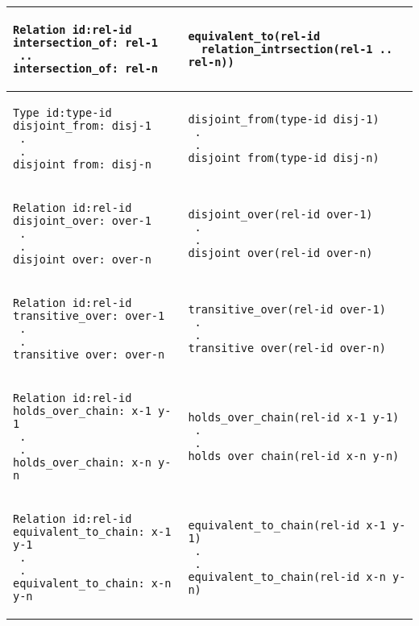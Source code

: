 \begin{scriptsize}
\begin{longtable}{ | p{7cm} | p{7cm} |}
\hline
\begin{verbatim}
Relation id:rel-id
intersection_of: rel-1
 ..
intersection_of: rel-n
\end{verbatim}
&
\begin{verbatim}
equivalent_to(rel-id 
  relation_intrsection(rel-1 .. rel-n))
\end{verbatim}
\\

\hline
\begin{verbatim}
Type id:type-id
disjoint_from: disj-1
 .
 .
disjoint_from: disj-n
\end{verbatim}
&
\begin{verbatim}
disjoint_from(type-id disj-1)
 .
 .
disjoint_from(type-id disj-n)
\end{verbatim}
\\

\hline
\begin{verbatim}
Relation id:rel-id
disjoint_over: over-1
 .
 .
disjoint_over: over-n
\end{verbatim}
&
\begin{verbatim}
disjoint_over(rel-id over-1)
 .
 .
disjoint_over(rel-id over-n)
\end{verbatim}
\\

\hline
\begin{verbatim}
Relation id:rel-id
transitive_over: over-1
 .
 .
transitive_over: over-n
\end{verbatim}
&
\begin{verbatim}
transitive_over(rel-id over-1)
 .
 .
transitive_over(rel-id over-n)
\end{verbatim}
\\

\hline
\begin{verbatim}
Relation id:rel-id
holds_over_chain: x-1 y-1
 .
 .
holds_over_chain: x-n y-n
\end{verbatim}
&
\begin{verbatim}
holds_over_chain(rel-id x-1 y-1)
 .
 .
holds_over_chain(rel-id x-n y-n)
\end{verbatim}
\\

\hline
\begin{verbatim}
Relation id:rel-id
equivalent_to_chain: x-1 y-1
 .
 .
equivalent_to_chain: x-n y-n
\end{verbatim}
&
\begin{verbatim}
equivalent_to_chain(rel-id x-1 y-1)
 .
 .
equivalent_to_chain(rel-id x-n y-n)
\end{verbatim}
\\


\end{longtable}
\end{scriptsize}
